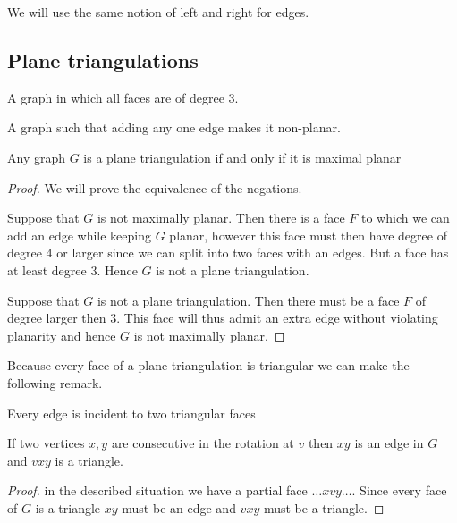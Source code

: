 We will use the same notion of left and right for edges.

\subsection{Plane triangulations}

\begin{defi} 
A graph in which all faces are of degree $3$.
\end{defi}

\begin{defi} 
A graph such that adding any one edge makes it non-planar.
\end{defi}

\begin{thrm}
Any graph $G$ is a plane triangulation if and only if it is maximal planar
\end{thrm}

\begin{proof}
We will prove the equivalence of the negations.

Suppose that $G$ is not maximally planar. Then there is a face $F$ to which we can add an edge while keeping $G$ planar, however this face must then have degree of degree $4$ or larger since we can split into two faces with an edges. But a face has at least degree 3. Hence $G$ is not a plane triangulation.

Suppose that $G$ is not a plane triangulation. Then there must be a face $F$ of degree larger then $3$. This face will thus admit an extra edge without violating planarity and hence $G$ is not maximally planar.
\end{proof}

Because every face of a plane triangulation is triangular we can make the following remark.

\begin{remark}
  Every edge is incident to two triangular faces
\end{remark}

\begin{lemma}
  \label{lm:prelim:rotationEdge}
  If two vertices $x, y$ are consecutive in the rotation at $v$ then $xy$ is an edge in $G$ and $vxy$ is a triangle.
\end{lemma}
\begin{proof}
  in the described situation we have a partial face $\ldots x v y \ldots$.  Since every face of $G$ is a triangle $xy$ must be an edge and $vxy$ must be a triangle.
\end{proof}

